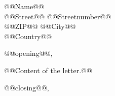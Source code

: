 \documentclass[a4paper, 
               ngerman %
               ]{letter}
\makeatletter
\newcommand{\recipient}{@@Name@@ \\ @@Street@@ @@Streetnumber@@ 
                            \\ @@ZIP@@ @@City@@ \\ @@Country@@}
\newcommand{\open}{@@opening@@,}
\newcommand{\close}{@@closing@@,}
\makeatother
\begin{document}
\begin{letter}{\recipient}
\opening{\open}
@@Content of the letter.@@

\closing{\close}


\end{letter}
\end{document}
